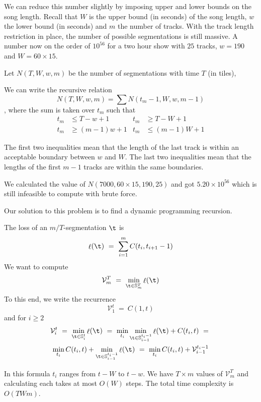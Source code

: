 \documentclass[twocolumn]{article}
\DeclareMathOperator{\loss}{\ell}
\newcommand{\segs}{\mathbb S}
\newcommand{\best}{\mathcal V}
\begin{document}
	We can reduce this number slightly by imposing upper and lower bounds on the song length.  Recall that $W$ is the upper bound (in seconds) of the song length, $w$ the lower bound (in seconds) and $m$ the number of tracks. With the track length restriction in place, the number of possible segmentations is still massive. A number now on the order of $10^{56}$ for a two hour show with $25$ tracks, $w=190$ and $W=60\times15$.
	
	
	
	Let $N(T,W,w,m)$ be the number of segmentations with time $T$ (in tiles),
	
	We can write the recursive relation $$N(T,W,w,m) = \sum N(t_m-1,W,w,m-1)$$, where the sum is taken over $t_m$ such that 
	\begin{align*}
		t_m &\le T-w+1 & t_m &\ge T-W+1\\
		t_m &\ge (m-1)w+1 & t_m &\le (m-1)W+1
	\end{align*}
	
	The first two inequalities mean that the length of the last track is within an acceptable boundary between $w$ and $W$. The last two inequalities mean that the lengths of the first $m-1$ tracks are within the same boundaries. 
	
	We calculated the value of $N(7000, 60\times15, 190, 25)$ and got $5.20 \times 10^{56}$ which is still infeasible to compute with brute force.
	
	
	
	Our solution to this problem is to find a dynamic programming recursion.
	
	The loss of an $m/T$-segmentation $\t$ is 
	\[
	\loss(\t) 
	~=~
	\sum_{i=1}^m C(t_i, t_{i+1}-1)
	\]
	We want to compute
	\[
	\best^T_m ~=~ \min_{\t \in \segs^T_m} \loss(\t)
	\]
	To this end, we write the recurrence
	\begin{equation*}
		\best^t_1 ~=~ C(1, t) 
	\end{equation*}
	and for $i\ge2$
	\begin{multline*}
		\best^t_i ~=~
		\min_{\t \in \segs^t_i} \loss(\t)
		~=~ \min_{t_i} \min_{\t \in \segs^{t_i-1}_{i-1}} \loss(\t) + C(t_i, t)~=~  \\
		\min_{t_i} C(t_i, t) + \min_{\t \in \segs^{t_i-1}_{i-1}} \loss(\t) 
		~=~ \min_{t_i} C(t_i, t) + \best^{t_i-1}_{i-1}
	\end{multline*}
	
	In this formula $t_i$ ranges from $t-W$ to $t-w$. We have $T \times m$ values of $\best^T_m$ and calculating each takes at most $O(W)$ steps. The total time complexity is $O(TWm)$.
	
\end{document}
